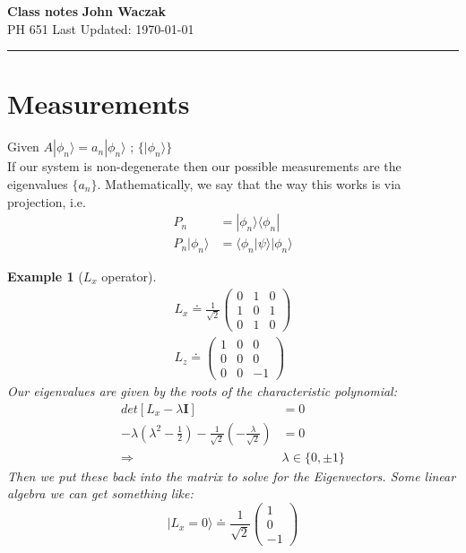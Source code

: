 \documentclass[a4paper, 11pt]{article}
\newtheorem*{Example}{Example}
\begin{document}
\noindent
\large\textbf{Class notes} \hfill \textbf{John Waczak} \\
\normalsize PH 651 \hfill  Last Updated: \today \\
\par\noindent\rule{\textwidth}{0.4pt}	
	
\section*{Measurements} 

Given $A|\phi_n\rangle = a_n |\phi_n\rangle$ ; $\{|\phi_n\rangle\} $ \\ 
If our system is non-degenerate then our possible measurements are the eigenvalues $\{a_n\}$. Mathematically, we say that the way this works is via projection, i.e. 
	\begin{align}
		P_n &= |\phi_n\rangle\langle \phi_n| \\ 
		P_n |\phi_n\rangle &= \langle\phi_n|\psi\rangle |\phi_n \rangle 
	\end{align}
	
\begin{Example}[$L_x$ operator]
	\begin{align*}
		L_x \doteq \frac{1}{\sqrt{2}} \begin{pmatrix}
		0 & 1 & 0 \\ 
		1 & 0 & 1 \\ 
		0 & 1 & 0 
		\end{pmatrix} \\
		L_z \doteq \begin{pmatrix}
		1 & 0 & 0 \\ 
		0 & 0 & 0 \\ 
		0 & 0 & -1 
		\end{pmatrix}
	\end{align*}
	Our eigenvalues are given by the roots of the characteristic polynomial: 
	\begin{align*}
		det[L_x-\lambda \mathbf{I}] &= 0 \\ 
		-\lambda(\lambda^2-\frac{1}{2})-\frac{1}{\sqrt{2}}(-\frac{\lambda}{\sqrt{2}}) &= 0 \\
		\Rightarrow &\lambda \in \{0, \pm 1\}
	\end{align*}
	Then we put these back into the matrix to solve for the Eigenvectors. Some linear algebra we can get something like: 
		\begin{equation*}
			|L_x=0\rangle \doteq \frac{1}{\sqrt{2}}\begin{pmatrix}1 \\ 0 \\ -1\end{pmatrix}
		\end{equation*}
\end{Example}
\end{document}
